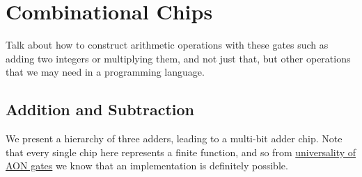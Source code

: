 \section{Combinational Chips}


  Talk about how to construct arithmetic operations with these gates such as adding two integers or multiplying them, and not just that, but other operations that we may need in a programming language. 

\subsection{Addition and Subtraction} 

  We present a hierarchy of three adders, leading to a multi-bit adder chip. Note that every single chip here represents a finite function, and so from  \hyperref[th-thm:aon_univ]{universality of AON gates} we know that an implementation is definitely possible. 
  
